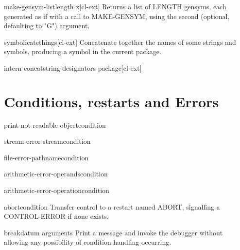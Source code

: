 \documentclass[10pt,english]{book}
\begin{document}
\begin{function}{make-gensym-list}{length \op x}[cl-ext]
  Returns a list of LENGTH gensyms, each generated as if with a call to MAKE-GENSYM,
using the second (optional, defaulting to "G") argument.
\end{function}

\begin{function}{symbolicate}{\rest things}[cl-ext]
  Concatenate together the names of some strings and symbols,
producing a symbol in the current package.
\end{function}

\begin{function}{intern-concat}{string-designators \op package}[cl-ext]
  
\end{function}


\chapter{Conditions, restarts and Errors}

\begin{function}{print-not-readable-object}{condition}
  
\end{function}

\begin{function}{stream-error-stream}{condition}
  
\end{function}

\begin{function}{file-error-pathname}{condition}
  
\end{function}

\begin{function}{arithmetic-error-operands}{condition}
  
\end{function}

\begin{function}{arithmetic-error-operation}{condition}
  
\end{function}

\begin{function}{abort}{\op condition}
  Transfer control to a restart named ABORT, signalling a CONTROL-ERROR if
   none exists.
\end{function}

\begin{function}{break}{\op datum \rest arguments}
  Print a message and invoke the debugger without allowing any possibility
   of condition handling occurring.
\end{function}
\end{document}
